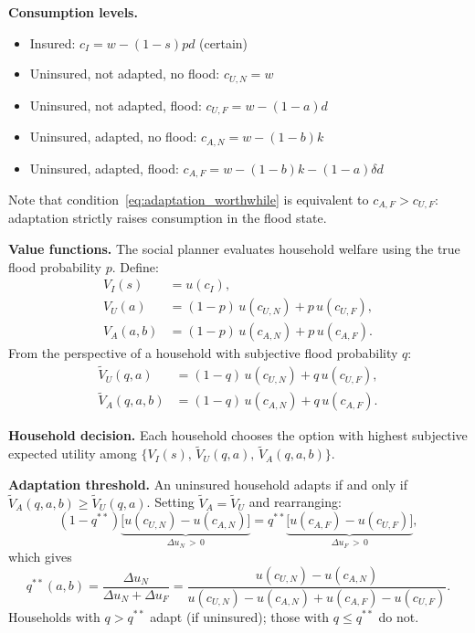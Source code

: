 \documentclass{article}
\begin{document}
\textbf{Consumption levels.}
\begin{itemize}
    \item Insured: $c_I = w - (1-s)pd$ (certain)
    \item Uninsured, not adapted, no flood: $c_{U,N} = w$
    \item Uninsured, not adapted, flood: $c_{U,F} = w - (1-a)d$
    \item Uninsured, adapted, no flood: $c_{A,N} = w - (1-b)k$
    \item Uninsured, adapted, flood: $c_{A,F} = w - (1-b)k - (1-a)\delta d$
\end{itemize}
Note that condition~\eqref{eq:adaptation_worthwhile} is equivalent to $c_{A,F} > c_{U,F}$: adaptation strictly raises consumption in the flood state.

\textbf{Value functions.} The social planner evaluates household welfare using the true flood probability $p$. Define:
\begin{align}
    V_I(s) &= u(c_I), \\
    V_U(a) &= (1-p)\,u(c_{U,N}) + p\,u(c_{U,F}), \\
    V_A(a,b) &= (1-p)\,u(c_{A,N}) + p\,u(c_{A,F}).
\end{align}
From the perspective of a household with subjective flood probability $q$:
\begin{align}
    \tilde{V}_U(q,a) &= (1-q)\,u(c_{U,N}) + q\,u(c_{U,F}), \\
    \tilde{V}_A(q,a,b) &= (1-q)\,u(c_{A,N}) + q\,u(c_{A,F}).
\end{align}

\textbf{Household decision.} Each household chooses the option with highest subjective expected utility among $\{V_I(s),\, \tilde{V}_U(q,a),\, \tilde{V}_A(q,a,b)\}$.

\textbf{Adaptation threshold.} An uninsured household adapts if and only if $\tilde{V}_A(q,a,b) \geq \tilde{V}_U(q,a)$. Setting $\tilde{V}_A = \tilde{V}_U$ and rearranging:
\begin{equation}
    (1-q^{**})\underbrace{\bigl[u(c_{U,N})-u(c_{A,N})\bigr]}_{\Delta u_N\,>\,0}
    =
    q^{**}\underbrace{\bigl[u(c_{A,F})-u(c_{U,F})\bigr]}_{\Delta u_F\,>\,0},
\end{equation}
which gives
\begin{equation}
    q^{**}(a,b) = \frac{\Delta u_N}{\Delta u_N + \Delta u_F}
    = \frac{u(c_{U,N})-u(c_{A,N})}{u(c_{U,N})-u(c_{A,N})+u(c_{A,F})-u(c_{U,F})}. \label{eq:qstarstar}
\end{equation}
Households with $q > q^{**}$ adapt (if uninsured); those with $q \leq q^{**}$ do not.
\end{document}
